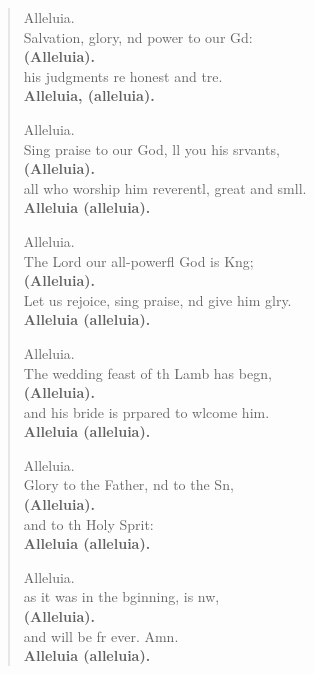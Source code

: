 \begin{verse}
  \begin{patverse}
Alleluia.\\
Salvation, glory, nd power to our Gd:\Med\\
\textbf{(Alleluia).}\\
his judgments re honest and tre.\Med\\
\textbf{Alleluia, (alleluia).}

Alleluia.\\
Sing praise to our God, ll you his srvants,\Med\\
\textbf{(Alleluia).}\\
all who worship him reverentl, great and smll.\Med\\
\textbf{Alleluia (alleluia).}

Alleluia.\\
The Lord our all-powerfl God is K\pointup{\i}ng;\Med\\
\textbf{(Alleluia).}\\
Let us rejoice, sing praise, nd give him glry.\Med\\
\textbf{Alleluia (alleluia).}

Alleluia.\\
The wedding feast of th Lamb has begn,\Med\\
\textbf{(Alleluia).}\\
and his bride is prpared to wlcome him.\Med\\
\textbf{Alleluia (alleluia).}

Alleluia.\\
Glory to the Father, nd to the Sn,\Med\\
\textbf{(Alleluia).}\\
and to th Holy Sp\pointup{\i}rit:\Med\\
\textbf{Alleluia (alleluia).}

Alleluia.\\
as it was in the bginning, is nw,\Med\\
\textbf{(Alleluia).}\\
and will be fr ever. Amn.\Med\\
\textbf{Alleluia (alleluia).}
  \end{patverse}
  \end{verse}
